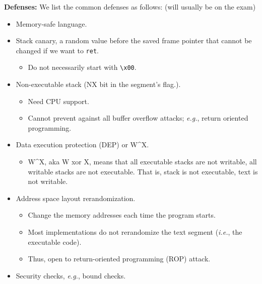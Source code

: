 \documentclass{article}
\newcommand{\parhead}[1]{\noindent \textbf{#1}}
\begin{document}
\parhead{Defenses:} We list the common defenses as follows: (will usually be on the exam)
\begin{itemize}
    \item Memory-safe language.
    
    \item Stack canary, a random value before the saved frame pointer that cannot be changed if we want to \texttt{ret}.
    \begin{itemize}
        \item Do not necessarily start with \texttt{\textbackslash x00}.
    \end{itemize}
    
    \item Non-executable stack (NX bit in the segment's flag.). 
    \begin{itemize}
        \item Need CPU support.
        \item Cannot prevent against all buffer overflow attacks; \emph{e.g.}, return oriented programming.
    \end{itemize}
    
    \item Data execution protection (DEP) or W\^{}X.
    \begin{itemize}
        \item W\^{}X, aka W xor X, means that all executable stacks are not writable, all writable stacks are not executable. That is, stack is not executable, text is not writable.
    \end{itemize}
    
    \item Address space layout rerandomization.
    \begin{itemize}
        \item Change the memory addresses each time the program starts.
    
        \item Most implementations do not rerandomize the text segment (\emph{i.e.}, the executable code).
        
        \item Thus, open to return-oriented programming (ROP) attack.
    \end{itemize}
    
    \item Security checks, \emph{e.g.}, bound checks.
\end{itemize}
\end{document}
